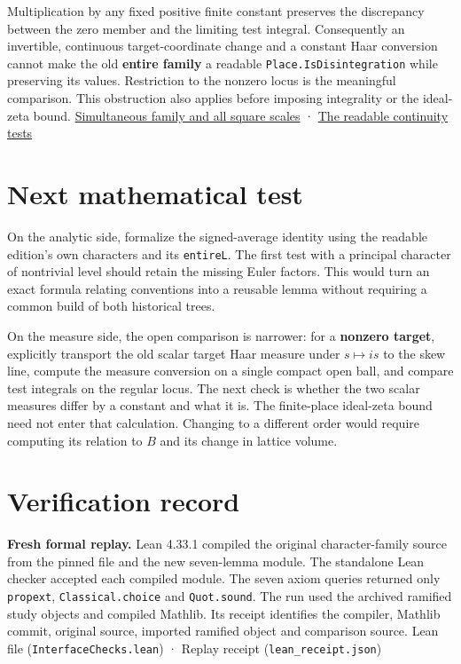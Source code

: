 \documentclass[11pt,letterpaper]{article}
\begin{document}
Multiplication by any fixed positive finite constant preserves the discrepancy between the zero member and the limiting test integral. Consequently an invertible, continuous target-coordinate change and a constant Haar conversion cannot make the old \textbf{entire family} a readable \nolinkurl{Place.IsDisintegration} while preserving its values. Restriction to the nonzero locus is the meaningful comparison. This obstruction also applies before imposing integrality or the ideal-zeta bound. \href{https://github.com/nousentllc/riemann-hypothesis/blob/17263859a4d27c62cfc67571737355f61a080806/research/uriel/experiments/ramified-square-dilates/dilates/DilateEndpoint.lean}{Simultaneous family and all square scales} · \href{https://github.com/nousentllc/riemann-hypothesis/blob/e063a923620ee7787b4a1270421478645bf66bdb/src/Lib/General/Measure/QuadricDisintegration.lean#L251-L265}{The readable continuity tests}

\section{Next mathematical test}

On the analytic side, formalize the signed-average identity using the readable edition's own characters and its \nolinkurl{entireL}. The first test with a principal character of nontrivial level should retain the missing Euler factors. This would turn an exact formula relating conventions into a reusable lemma without requiring a common build of both historical trees.

On the measure side, the open comparison is narrower: for a \textbf{nonzero target}, explicitly transport the old scalar target Haar measure under $s\mapsto i s$ to the skew line, compute the measure conversion on a single compact open ball, and compare test integrals on the regular locus. The next check is whether the two scalar measures differ by a constant and what it is. The finite-place ideal-zeta bound need not enter that calculation. Changing to a different order would require computing its relation to $B$ and its change in lattice volume.

\section{Verification record}

\textbf{Fresh formal replay.} Lean 4.33.1 compiled the original character-family source from the pinned file and the new seven-lemma module. The standalone Lean checker accepted each compiled module. The seven axiom queries returned only \nolinkurl{propext}, \nolinkurl{Classical.choice} and \nolinkurl{Quot.sound}. The run used the archived ramified study objects and compiled Mathlib. Its receipt identifies the compiler, Mathlib commit, original source, imported ramified object and comparison source. Lean file (\nolinkurl{InterfaceChecks.lean}) · Replay receipt (\nolinkurl{lean_receipt.json})
\end{document}
